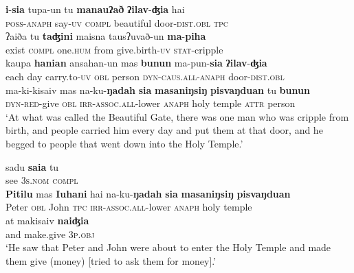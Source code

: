 \documentclass[output=paper
,modfonts
,nonflat]{langsci/langscibook}
\begin{document}
\begin{exe}
	\label{tx3-2}
	\begin{xlist}
		\ex\label{tx3-2a}
		\gll \textbf{i}-\textbf{sia}  tupa-un  tu  \textbf{manauʔað}  \textbf{ʔilav}-\textbf{ʤia}  hai\\
		\textsc{poss}-\textsc{anaph}  say-\textsc{uv}  \textsc{compl}  beautiful  door-\textsc{dist.obl}  \textsc{tpc}\\
		\ex\label{tx3-2b}
		\gll ʔaiða  tu  \textbf{taʤini}  maisna  tausʔuvað-un  \textbf{ma}-\textbf{piha}\\
		exist  \textsc{compl}  one.\textsc{hum}  from  give.birth-\textsc{uv}  \textsc{stat}-cripple\\
		\ex\label{tx3-2c}
		\gll kaupa  \textbf{hanian}  ansahan-un  mas  \textbf{bunun}  ma-pun-\textbf{sia}  \textbf{ʔilav}-\textbf{ʤia}\\
		each  day  carry.to-\textsc{uv}  \textsc{obl}  person  \textsc{dyn}-\textsc{caus}.\textsc{all}-\textsc{anaph}  door-\textsc{dist}.\textsc{obl}\\
		\ex\label{tx3-2d}
		\gll ma-ki-kisaiv  mas  na-ku-\textbf{ŋadah}  \textbf{sia}  \textbf{masaniŋsiŋ} \textbf{pisvaŋduan}  tu  \textbf{bunun}\\
		\textsc{dyn}-\textsc{red}-give  \textsc{obl}  \textsc{irr}-\textsc{assoc}.\textsc{all}-lower  \textsc{anaph}  holy  temple  \textsc{attr}  person\\
		\glt `At what was called the Beautiful Gate, there was one man who was cripple from birth, and people carried him every day and put them at that door, and he begged to people that went down into the Holy Temple.’
	\end{xlist}
\end{exe}

\begin{exe}
	\label{tx3-3}
	\begin{xlist}
		\ex\label{tx3-3a}
		\gll sadu  \textbf{saia}  tu\\
		see  \textsc{3s}.\textsc{nom}  \textsc{compl}\\
		\ex\label{tx3-3b}
		\gll \textbf{Pitilu}  mas  \textbf{Iuhani}  hai  na-ku-\textbf{ŋadah}  \textbf{sia}  \textbf{masaniŋsiŋ}  \textbf{pisvaŋduan}\\
		Peter  \textsc{obl}  John  \textsc{tpc}  \textsc{irr}-\textsc{assoc}.\textsc{all}-lower  \textsc{anaph}  holy  temple\\
		\ex\label{tx3-3c}
		\gll at  makisaiv  \textbf{naiʤia}\\
		and  make.give  \textsc{3p}.\textsc{obj}\\
		\glt `He saw that Peter and John were about to enter the Holy Temple and made them give (money) [tried to ask them for money].’
	\end{xlist}
\end{exe}
\end{document}
